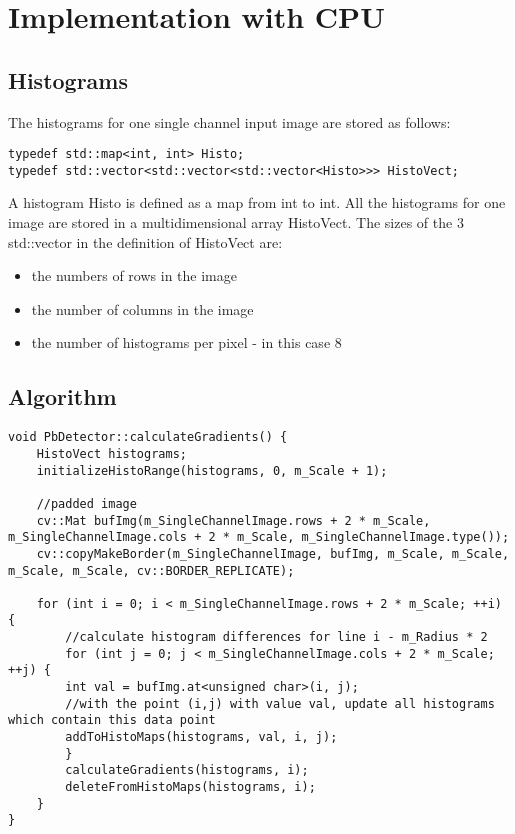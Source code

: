 \section{Implementation with CPU}

\subsection {Histograms}

The histograms for one single channel input image are stored as follows:

\begin{lstlisting}
typedef std::map<int, int> Histo;
typedef std::vector<std::vector<std::vector<Histo>>> HistoVect;
\end{lstlisting}

A histogram Histo is defined as a map from int to int. All the histograms for one image are stored in a multidimensional array HistoVect. The sizes of the 3 std::vector in the definition of HistoVect are:
\begin{itemize}
	\item the numbers of rows in the image
	\item the number of columns in the image
	\item the number of histograms per pixel - in this case 8
\end{itemize}

\subsection {Algorithm}

\begin{lstlisting}
void PbDetector::calculateGradients() {
	HistoVect histograms;
	initializeHistoRange(histograms, 0, m_Scale + 1);
	
	//padded image
	cv::Mat bufImg(m_SingleChannelImage.rows + 2 * m_Scale, m_SingleChannelImage.cols + 2 * m_Scale, m_SingleChannelImage.type());
	cv::copyMakeBorder(m_SingleChannelImage, bufImg, m_Scale, m_Scale, m_Scale, m_Scale, cv::BORDER_REPLICATE);
	
	for (int i = 0; i < m_SingleChannelImage.rows + 2 * m_Scale; ++i) {
		//calculate histogram differences for line i - m_Radius * 2
		for (int j = 0; j < m_SingleChannelImage.cols + 2 * m_Scale; ++j) {
		int val = bufImg.at<unsigned char>(i, j);
		//with the point (i,j) with value val, update all histograms which contain this data point
		addToHistoMaps(histograms, val, i, j);
		}
		calculateGradients(histograms, i);
		deleteFromHistoMaps(histograms, i);
	}
}
\end{lstlisting}

